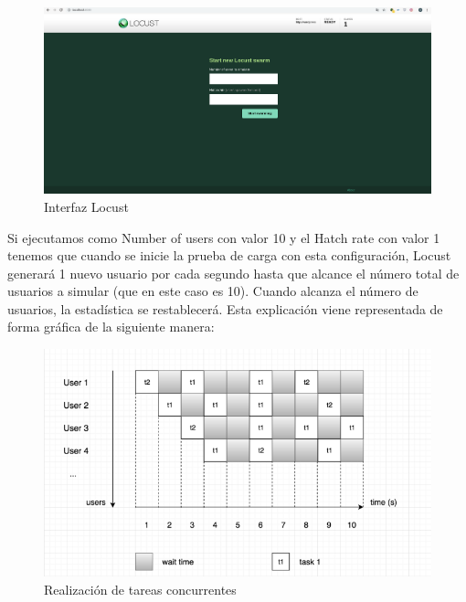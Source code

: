 \begin{figure}[H]
	\centering
	\includegraphics[scale=0.2]{imagenes/carga/locustInterfaz.png}
	\caption{Interfaz Locust} \label{locust_interfaz}
\end{figure}

Si ejecutamos como Number of users con valor 10 y el Hatch rate con valor 1 tenemos que cuando se inicie la prueba de carga con esta configuración, Locust generará 1 nuevo usuario por cada segundo hasta que alcance el número total de usuarios a simular (que en este caso es 10). Cuando alcanza el número de usuarios, la estadística se restablecerá.
\newpage
Esta explicación viene representada de forma gráfica de la siguiente manera:

\begin{figure}[H]
	\centering
	\includegraphics[scale=0.2]{imagenes/carga/explicacion_locust.png}
	\caption{Realización de tareas concurrentes} \label{locust}
\end{figure}

